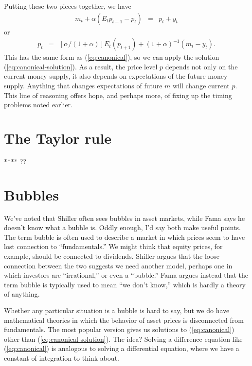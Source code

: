 \documentclass[11pt]{article}
\begin{document}
Putting these two pieces together, we have
\begin{eqnarray*}
    m_t + \alpha (E_t p_{t+1} - p_t ) &=& p_t + y_t
\end{eqnarray*}
or
\begin{eqnarray*}
    p_t  &=& [\alpha/(1+\alpha)] E_t (p_{t+1})  + (1+\alpha)^{-1} (m_t- y_t).
\end{eqnarray*}
This has the same form as (\ref{eq:canonical}),
so we can apply the solution (\ref{eq:canonical-solution}).
As a result, the price level $p$ depends not only on the current money
supply, it also depends on expectations of the future money supply.
Anything that changes expectations of future $m$ will change current $p$.
This line of reasoning offers hope, and perhaps more,
of fixing up the timing problems noted earlier.

\section{The Taylor rule}


**** ??


\section{Bubbles}

We've noted that Shiller often sees bubbles in asset markets,
while Fama says he doesn't know what a bubble is.
Oddly enough, I'd say both make useful points.
The term bubble is often used to describe a market in which prices
seem to have lost connection to ``fundamentals.''
We might think that equity prices, for example, should be connected to dividends.
Shiller argues that the loose connection between the two suggests we need another model,
perhaps one in which investors are ``irrational,''
or even a ``bubble.''
Fama argues instead that the term bubble is typically used to mean ``we don't know,''
which is hardly a theory of anything.

Whether any particular situation is a bubble is hard to say,
but we do have mathematical theories in which the behavior of asset prices is
disconnected from fundamentals.
The most popular version gives us solutions to (\ref{eq:canonical})
other than (\ref{eq:canonical-solution}).
The idea?
Solving a difference equation like (\ref{eq:canonical}) is analogous to solving a differential
equation, where we have a constant of integration to think about.
\end{document}
